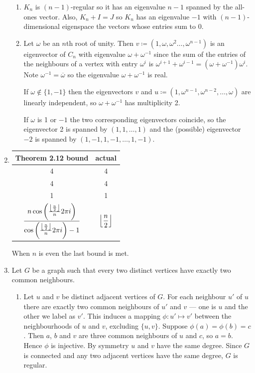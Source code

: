\documentclass[a4paper, 12pt]{article}
\DeclarePairedDelimiter\floor{\lfloor}{\rfloor}
\begin{document}
\begin{enumerate}
\begin{enumerate}
\item \(K_n\) is \((n-1)\)-regular so it has an eigenvalue \(n-1\) spanned by the all-ones vector. Also, \(K_n+I=J\) so \(K_n\) has an eigenvalue \(-1\) with \((n-1)\)-dimensional eigenspace the vectors whose entries sum to 0.

\item Let \(\omega\) be an \(n\)th root of unity. Then \(v\coloneqq(1,\omega,\omega^2\dots,\omega^{n-1})\) is an eigenvector of \(C_n\) with eigenvalue \(\omega+\omega^{-1}\) since the sum of the entries of the neighbours of a vertex with entry \(\omega^i\) is \(\omega^{i+1}+\omega^{i-1}=(\omega+\omega^{-1})\omega^i\). Note \(\omega^{-1}=\overline\omega\) so the eigenvalue \(\omega+\omega^{-1}\) is real.

If \(\omega\notin\{1,-1\}\) then the eigenvectors \(v\) and \(u\coloneqq(1,\omega^{n-1},\omega^{n-2},\dots,\omega)\) are linearly independent, so \(\omega+\omega^{-1}\) has multiplicity 2.

If \(\omega\) is 1 or \(-1\) the two corresponding eigenvectors coincide, so the eigenvector 2 is spanned by \((1,1,\dots,1)\) and the (possible) eigenvector \(-2\) is spanned by \((1,-1,1,-1,\dots,1,-1)\).

\end{enumerate}

\item \begin{tabular}{@{}cc@{}}\toprule
Theorem 2.12 bound&actual\\\midrule
4&4\\
4&4\\
1&1\\
\(\displaystyle \frac{n\cos\left(\frac{\floor*{\frac n2}}n2\pi i\right)}{\cos\left(\frac{\floor*{\frac n2}}n2\pi i\right)-1}\)&\(\displaystyle\floor*{\frac n2}\)\\
\bottomrule
\end{tabular}

When \(n\) is even the last bound is met.

\item Let \(G\) be a graph such that every two distinct vertices have exactly two common neighbours.

\begin{enumerate}

\item Let \(u\) and \(v\) be distinct adjacent vertices of \(G\). For each neighbour \(u'\) of \(u\) there are exactly two common neighbours of \(u'\) and \(v\) --- one is \(u\) and the other we label as \(v'\). This induces a mapping \(\phi\colon u'\mapsto v'\) between the neighbourhoods of \(u\) and \(v\), excluding \(\{u,v\}\). Suppose \(\phi(a)=\phi(b)=c\). Then \(a\), \(b\) and \(v\) are three common neighbours of \(u\) and \(c\), so \(a=b\). Hence \(\phi\) is injective. By symmetry \(u\) and \(v\) have the same degree. Since \(G\) is connected and any two adjacent vertices have the same degree, \(G\) is regular.


\end{enumerate}
\end{enumerate}
\end{document}
